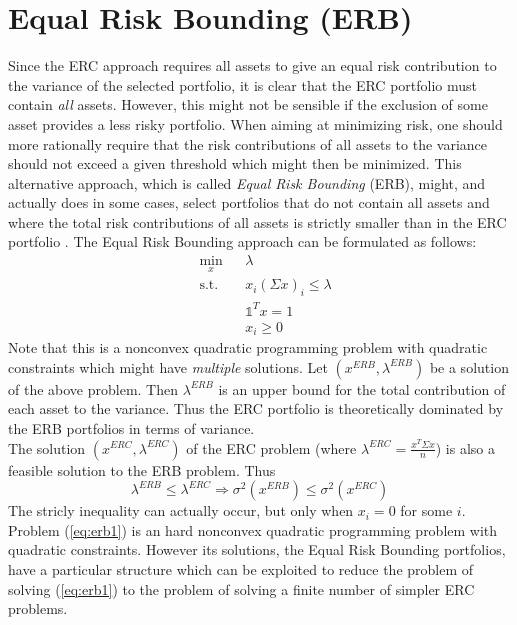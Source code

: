 \section{Equal Risk Bounding (ERB)}
Since the ERC approach requires all assets to give an equal risk contribution to the variance of the selected portfolio, it is clear that the ERC portfolio must contain \textit{all} assets\footnotemark[4]. However, this might not be sensible if the exclusion of some asset provides a less risky portfolio. When aiming at minimizing risk, one should more rationally require that the risk contributions of all assets to the variance should not exceed a given threshold which might then be minimized. This alternative approach, which is called \textit{Equal Risk Bounding} (ERB), might, and actually does in some cases, select portfolios that do not contain all assets and where the total risk contributions of all assets is strictly smaller than in the ERC portfolio \cite{erb}. The Equal Risk Bounding approach can be formulated as follows:
\begin{equation}\label{eq:erb1}
\begin{aligned}
& \min_x
& & \lambda\\
& \text{s.t.}
& & x_i (\Sigma x)_i \leq \lambda\\
&&&\mathds{1}^T x =1\\
&&&x_i \geq 0
\end{aligned}
\end{equation}
Note that this is a nonconvex quadratic programming problem with quadratic constraints which might have \textit{multiple} solutions. Let $(x^{ERB},\lambda^{ERB})$ be a solution of the above problem. Then $\lambda^{ERB}$ is an upper bound for the total contribution of each asset to the variance. Thus the ERC portfolio is theoretically dominated by the ERB portfolios in terms of variance.\\
The solution $(x^{ERC},\lambda^{ERC})$ of the ERC problem (where $\lambda^{ERC} = \frac{x^{T} \Sigma x}{n}$) is also a feasible solution to the ERB problem. Thus
\begin{equation}
\lambda^{ERB} \leq \lambda^{ERC} \Rightarrow \sigma^2(x^{ERB}) \leq \sigma^2(x^{ERC})
\end{equation}
The stricly inequality can actually occur, but only when $x_i=0$ for some $i$.\\
Problem (\ref{eq:erb1}) is an hard nonconvex quadratic programming problem with quadratic constraints. However its solutions, the Equal Risk Bounding portfolios, have a particular structure which can be exploited to reduce the problem of solving (\ref{eq:erb1}) to the problem of solving a finite number of simpler ERC problems.
